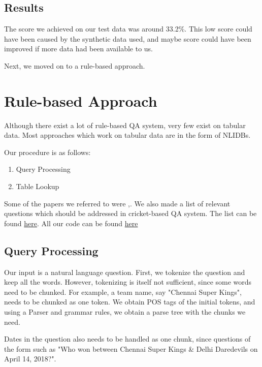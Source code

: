 \documentclass[a4paper]{article}
\begin{document}
\subsection{Results}\label{subsec: results}
The score we achieved on our test data was around 33.2\%. This low score could have been caused by the synthetic data used, and maybe score could have been improved if more data had been available to us.

Next, we moved on to a rule-based approach.
\section{Rule-based Approach}\label{sec:rbapproach}
Although there exist a lot of rule-based QA system, very few exist on tabular data. Most approaches which work on tabular data are in the form of NLIDBs.

Our procedure is as follows:
\begin{enumerate}
	\item Query Processing
	\item Table Lookup
\end{enumerate}

Some of the papers we referred to were \cite{quarc},\cite{DWIVEDI2013417}.
We also made a list of relevant questions which should be addressed in cricket-based QA system. The list can be found \href{https://docs.google.com/document/d/1Iiwfx7Hm9N0VpjTHIgSzxjeoOtr6RSk1FLHRPZb53Xo/edit?usp=sharing}{here}.
All our code can be found \href{https://github.com/ravsimar-sodhi/cricket-scoreboard-scrape}{here}

\subsection{Query Processing}\label{subsec:queryproc}
Our input is a natural language question. First, we tokenize the question and keep all the words. However, tokenizing is itself not sufficient, since some words need to be chunked. For example, a team name, say "Chennai Super Kings", needs to be chunked as one token.
We obtain POS tags of the initial tokens, and using a Parser and grammar rules,
we obtain a parse tree with the chunks we need.

Dates in the question also needs to be handled as one chunk, since questions of the form such as "Who won between Chennai Super Kings \& Delhi Daredevils on April 14, 2018?".
\end{document}
